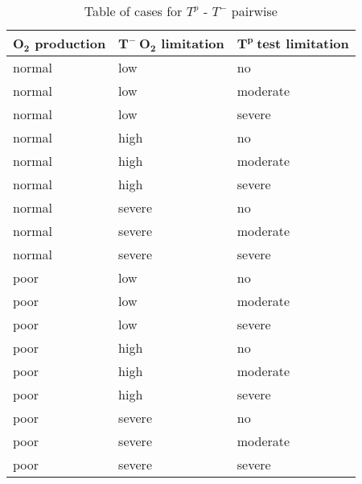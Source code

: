 \begin{table}
  \centering
  \begin{tabular}{|l|l|l|}
    \hline
    \textbf{$\boldsymbol{O_2}$ production} & \textbf{$\boldsymbol{T^-\ O_2}$ limitation} & \textbf{$\boldsymbol{T^p\ test}$ limitation}\\ \hline
    normal & low & no \\ \hline
    normal & low & moderate \\ \hline
    normal & low & severe \\ \hline
    normal & high & no \\ \hline
    normal & high & moderate \\ \hline
    normal & high & severe \\ \hline
    normal & severe & no \\ \hline
    normal & severe & moderate \\ \hline
    normal & severe & severe \\ \hline
    poor & low & no \\ \hline
    poor & low & moderate \\ \hline
    poor & low & severe \\ \hline
    poor & high & no \\ \hline
    poor & high & moderate \\ \hline
    poor & high & severe \\ \hline
    poor & severe & no \\ \hline
    poor & severe & moderate \\ \hline
    poor & severe & severe \\ \hline
  \end{tabular}
  \caption{Table of cases for $T^p$ - $T^-$ pairwise}
  \label{tab_Tpro-Tneg_cases}
\end{table}

\newpage

